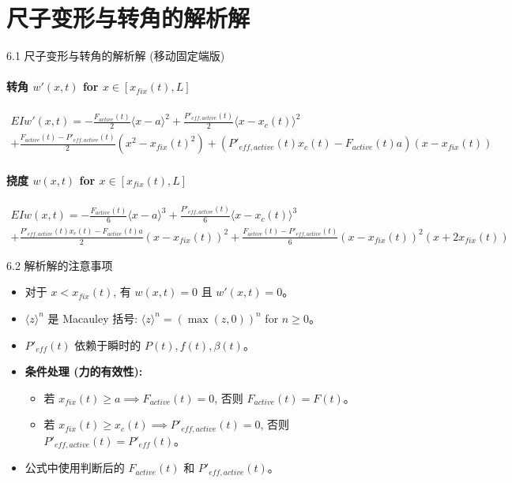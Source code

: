 \documentclass{beamer}
\begin{document}
\section{尺子变形与转角的解析解}
\begin{frame}{6.1 尺子变形与转角的解析解 (移动固定端版)}
    \framesubtitle{转角 $w'(x,t)$ for $x \in [x_{fix}(t), L]$}
    \begin{multline*}
        \boxed{EI w'(x,t) = -\frac{F_{active}(t)}{2} \langle x-a \rangle^2 + \frac{P'_{eff, active}(t)}{2} \langle x-x_c(t) \rangle^2} \\
        \boxed{+ \frac{F_{active}(t)-P'_{eff, active}(t)}{2}(x^2 - x_{fix}(t)^2) + (P'_{eff, active}(t)x_c(t) - F_{active}(t)a)(x-x_{fix}(t))}
    \end{multline*}
    \vspace{0.5em}
    \framesubtitle{挠度 $w(x,t)$ for $x \in [x_{fix}(t), L]$}
    \begin{multline*}
    \boxed{EI w(x,t) = -\frac{F_{active}(t)}{6} \langle x-a \rangle^3 + \frac{P'_{eff, active}(t)}{6} \langle x-x_c(t) \rangle^3} \\
    \boxed{+ \frac{P'_{eff, active}(t)x_c(t) - F_{active}(t)a}{2}(x-x_{fix}(t))^2 + \frac{F_{active}(t)-P'_{eff, active}(t)}{6}(x-x_{fix}(t))^2(x+2x_{fix}(t))}
    \end{multline*}
\end{frame}

\begin{frame}{6.2 解析解的注意事项}
    \begin{itemize}
        \item 对于 $x < x_{fix}(t)$, 有 $w(x,t) = 0$ 且 $w'(x,t) = 0$。
        \item $\langle z \rangle^n$ 是 Macauley 括号: $\langle z \rangle^n = (\max(z, 0))^n$ for $n \ge 0$。
        \item $P'_{eff}(t)$ 依赖于瞬时的 $P(t), f(t), \beta(t)$。
        \item \textbf{条件处理 (力的有效性):}
            \begin{itemize}
                \item 若 $x_{fix}(t) \ge a \implies F_{active}(t) = 0$, 否则 $F_{active}(t) = F(t)$。
                \item 若 $x_{fix}(t) \ge x_c(t) \implies P'_{eff, active}(t) = 0$, 否则 $P'_{eff, active}(t) = P'_{eff}(t)$。
            \end{itemize}
        \item 公式中使用判断后的 $F_{active}(t)$ 和 $P'_{eff, active}(t)$。
    \end{itemize}
\end{frame}
\end{document}
